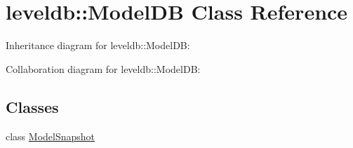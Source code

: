 \hypertarget{classleveldb_1_1_model_d_b}{}\section{leveldb\+:\+:Model\+D\+B Class Reference}
\label{classleveldb_1_1_model_d_b}


Inheritance diagram for leveldb\+:\+:Model\+D\+B\+:


Collaboration diagram for leveldb\+:\+:Model\+D\+B\+:
\subsection*{Classes}
\begin{DoxyCompactItemize}
\item 
class \hyperlink{classleveldb_1_1_model_d_b_1_1_model_snapshot}{Model\+Snapshot}
\end{DoxyCompactItemize}

